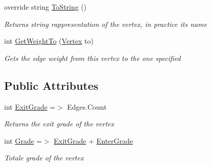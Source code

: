 \begin{DoxyCompactItemize}
override string \hyperlink{class_graph_1_1_vertex_a235f3019b6b480a8bf4c8116a5d30bf4}{To\+String} ()
\begin{DoxyCompactList}\small\item\em Returns string rappresentation of the vertex, in practice its name \end{DoxyCompactList}\item 
int \hyperlink{class_graph_1_1_vertex_aa96f873cf862f818c345a5d97c3b62c1}{Get\+Weight\+To} (\hyperlink{class_graph_1_1_vertex}{Vertex} to)
\begin{DoxyCompactList}\small\item\em Gets the edge weight from this vertex to the one specified \end{DoxyCompactList}\end{DoxyCompactItemize}
\subsection*{Public Attributes}
\begin{DoxyCompactItemize}
\item 
int \hyperlink{class_graph_1_1_vertex_ab165fd05985d7ab12341f97abcde9e79}{Exit\+Grade} =$>$ Edges.\+Count
\begin{DoxyCompactList}\small\item\em Returns the exit grade of the vertex \end{DoxyCompactList}\item 
int \hyperlink{class_graph_1_1_vertex_a120c6d309edf2487e4d7d8463f586dc4}{Grade} =$>$ \hyperlink{class_graph_1_1_vertex_ab165fd05985d7ab12341f97abcde9e79}{Exit\+Grade} + \hyperlink{class_graph_1_1_vertex_a63c478ac5624dcd7d424212e1b4fa923}{Enter\+Grade}
\begin{DoxyCompactList}\small\item\em Totale grade of the vertex \end{DoxyCompactList}\end{DoxyCompactItemize}
